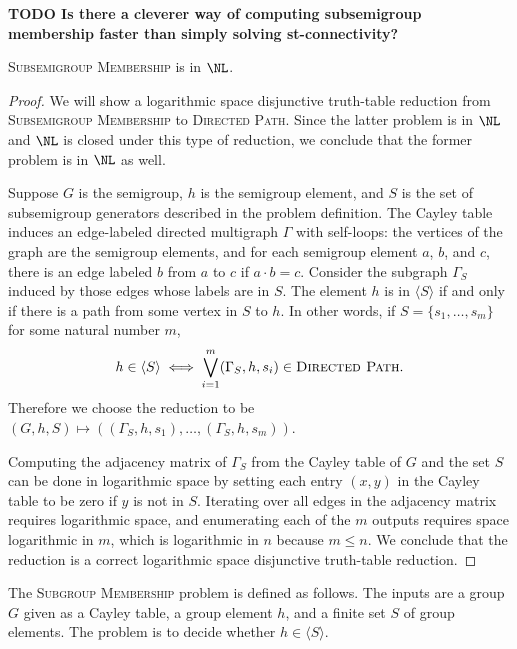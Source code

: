 \documentclass{article}
\newcommand{\todo}[1]{\textbf{TODO #1}}
\newcommand{\gen}[1]{\langle #1 \rangle}
\DeclareMathOperator{\Path}{Path}
\begin{document}
\todo{Is there a cleverer way of computing subsemigroup membership faster than simply solving st-connectivity?}

\begin{lemma}\label{lem:subsemigroupmem}
  \textsc{Subsemigroup Membership} is in $\NL$.
\end{lemma}
\begin{proof}
  We will show a logarithmic space disjunctive truth-table reduction from \textsc{Subsemigroup Membership} to \textsc{Directed Path}.
  Since the latter problem is in $\NL$ and $\NL$ is closed under this type of reduction, we conclude that the former problem is in $\NL$ as well.

  Suppose $G$ is the semigroup, $h$ is the semigroup element, and $S$ is the set of subsemigroup generators described in the problem definition.
  The Cayley table induces an edge-labeled directed multigraph $\Gamma$ with self-loops: the vertices of the graph are the semigroup elements, and for each semigroup element $a$, $b$, and $c$, there is an edge labeled $b$ from $a$ to $c$ if $a \cdot b = c$.
  Consider the subgraph $\Gamma_S$ induced by those edges whose labels are in $S$.
  The element $h$ is in $\gen{S}$ if and only if there is a path from some vertex in $S$ to $h$.
  In other words, if $S = \{s_1, \dotsc, s_m\}$ for some natural number $m$,
  \begin{equation*}
    h \in \gen{S} \iff \bigvee_{i = 1}^m (\Gamma_S, h, s_i) \in \textsc{Directed Path}.
  \end{equation*}
  Therefore we choose the reduction to be $(G, h, S) \mapsto ((\Gamma_S, h, s_1), \dotsc, (\Gamma_S, h, s_m))$.

  Computing the adjacency matrix of $\Gamma_S$ from the Cayley table of $G$ and the set $S$ can be done in logarithmic space by setting each entry $(x, y)$ in the Cayley table to be zero if $y$ is not in $S$.
  Iterating over all edges in the adjacency matrix requires logarithmic space, and enumerating each of the $m$ outputs requires space logarithmic in $m$, which is logarithmic in $n$ because $m \leq n$.
  We conclude that the reduction is a correct logarithmic space disjunctive truth-table reduction.
\end{proof}

The \textsc{Subgroup Membership} problem is defined as follows.
The inputs are a group $G$ given as a Cayley table, a group element $h$, and a finite set $S$ of group elements.
The problem is to decide whether $h \in \gen{S}$.
\end{document}
